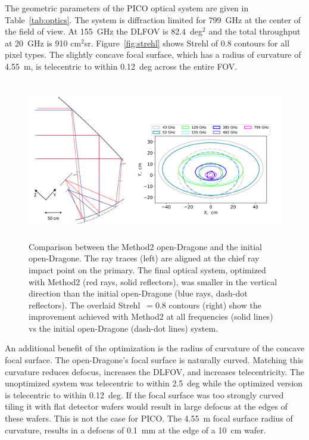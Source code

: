 \documentclass[]{spie}  %
\begin{document}
The geometric parameters of the PICO optical system are given in Table~\ref{tab:optics}. The 
system is diffraction limited for 799~GHz at the center of the field of view. At 155~GHz the 
DLFOV is 82.4~deg$^2$ and the total throughput at 20~GHz is 910 cm$^2$sr. 
Figure~\ref{fig:strehl} shows Strehl of 0.8 contours for all pixel types.
The slightly concave focal surface, which has a radius of curvature of 4.55~m, is telecentric to 
within 0.12~deg across the entire FOV.

\begin{figure} [ht]
\begin{center}
\includegraphics[height=7cm]{jpl_vs_V3D.png}
\end{center}
\caption { \label{fig:compare} 
Comparison between the Method2 open-Dragone and the initial open-Dragone.  
The ray traces (left) are aligned at the chief ray impact point on the primary. 
The final optical system, optimized with Method2 (red rays, solid reflectors), was smaller in the vertical direction 
than the initial open-Dragone (blue rays, dash-dot reflectors). The overlaid Strehl~$=0.8$ contours 
(right) show the improvement achieved with Method2 at all frequencies (solid lines) vs the initial open-Dragone (dash-dot lines) system. 
}
\end{figure} 

An additional benefit of the optimization is the radius of curvature of the concave focal surface. 
The open-Dragone's focal surface is naturally curved.  Matching this 
curvature reduces defocus, increases the DLFOV, and increases telecentricity.  The unoptimized system was telecentric to within 
2.5~deg while the optimized version is telecentric to within 0.12~deg. If the focal surface was too strongly curved tiling it with flat detector 
wafers would result in large defocus at the edges of these wafers.  This is not the case for PICO. The 4.55~m focal surface radius of curvature, 
results in a defocus of 0.1~mm at the edge of a 10~cm wafer. 
\end{document}

